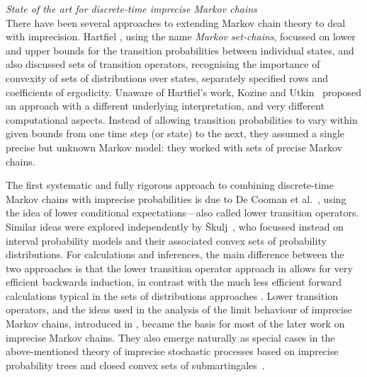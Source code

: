 \documentclass[11pt,dvipsnames,usenames,a4paper]{article}
\begin{document}
\emph{State of the art for discrete-time imprecise Markov chains}\\[5pt]
There have been several approaches to extending Markov chain theory to deal with imprecision. 
Hartfiel \cite{hartfiel1998}, using the name \emph{Markov set-chains}, focussed on lower and upper bounds for the transition probabilities between individual states, and also discussed sets of transition operators, recognising the importance of convexity of sets of distributions over states, separately specified rows and coefficients of ergodicity. 
Unaware of Hartfiel's work, Kozine and Utkin~\cite{utkin:02} proposed an approach with a different underlying interpretation, and very different computational aspects. 
Instead of allowing transition probabilities to vary within given bounds from one time step (or state) to the next, they assumed a single precise but unknown Markov model: they worked with sets of precise Markov chains. 

The first systematic and fully rigorous approach to combining discrete-time Markov chains with imprecise probabilities is due to De Cooman et al.~\cite{cooman2008}, using the idea of lower conditional expectations---also called lower transition operators. 
Similar ideas were explored independently by Škulj~\cite{skulj:09}, who focussed instead on interval probability models and their associated convex sets of probability distributions. 
For calculations and inferences, the main difference between the two approaches is that the lower transition operator approach in \cite{cooman2008} allows for very efficient backwards induction, in contrast with the much less efficient forward calculations typical in the sets of distributions approaches \cite{skulj:09}. 
Lower transition operators, and the ideas used in the analysis of the limit behaviour of imprecise Markov chains, introduced in \cite{cooman2008}, became the basis for most of the later work on imprecise Markov chains. 
They also emerge naturally as special cases in the above-mentioned theory of imprecise stochastic processes based on imprecise probability trees and closed convex sets of submartingales~\cite{cooman2015:markovergodic}.
\end{document}
